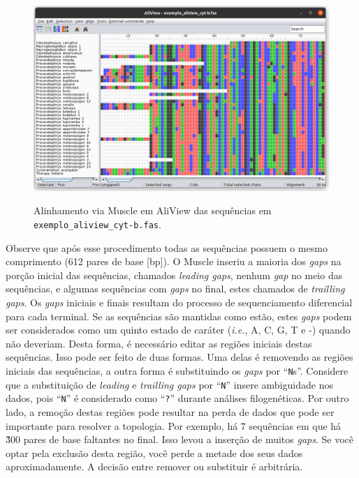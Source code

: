 \begin{refsection}
  \begin{figure}[h!]
       \centering
      {\includegraphics[scale=0.4]{figures/tut7/aliview_03.png}}
	{\caption[AliView: alinhamento]{Alinhamento via Muscle em AliView das sequências em \texttt{exemplo\_aliview\_cyt-b.fas}.}\label{tut7:fig:AliView_aligned}}
  \end{figure}


Observe que após esse procedimento todas as sequências possuem o mesmo comprimento (612 pares de base [bp]). O Muscle inseriu a maioria dos \textit{gaps} na porção inicial das sequências, chamados \textit{leading gaps}, nenhum \textit{gap} no meio das sequências, e algumas sequências com \textit{gaps} no final, estes chamados de \textit{trailling gaps}. Os \textit{gaps} iniciais e finais resultam do processo de sequenciamento diferencial para cada terminal. Se as sequências são mantidas como estão, estes \textit{gaps} podem ser considerados como um quinto estado de caráter (\textit{i.e.}, A, C, G, T e -) quando não deveriam. Desta forma, é necessário editar as regiões iniciais destas sequências. Isso pode ser feito de duas formas. Uma delas é removendo as regiões iniciais das sequências, a outra forma é substituindo os \textit{gaps} por ``\texttt{N}s''. Considere que a substituição de \textit{leading} e \textit{trailling gaps} por ``\texttt{N}'' insere ambiguidade nos dados, pois ``\texttt{N}'' é considerado como ``\texttt{?}'' durante análises filogenéticas. Por outro lado, a remoção destas regiões pode resultar na perda de dados que pode ser importante para resolver a topologia. Por exemplo, há 7 sequências em que há \~300 pares de base faltantes no final. Isso levou a inserção de muitos \textit{gaps}. Se você optar pela exclusão desta região, você perde a metade dos seus dados aproximadamente. A decisão entre remover ou substituir é arbitrária.\\


\end{refsection}

